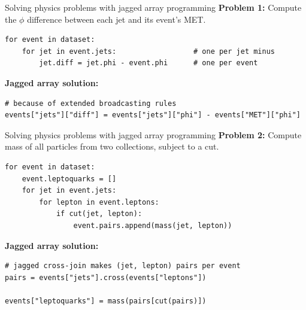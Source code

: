 \documentclass[aspectratio=169]{beamer}
\begin{document}
\begin{frame}[fragile]{Solving physics problems with jagged array programming}
\vspace{0.5 cm}
{\bf Problem 1:} Compute the $\phi$ difference between each jet and its event's MET.
\small
\begin{verbatim}
for event in dataset:
    for jet in event.jets:                  # one per jet minus
        jet.diff = jet.phi - event.phi      # one per event
\end{verbatim}
\normalsize

\vspace{0.5 cm}
{\bf Jagged array solution:} 
\small
\begin{verbatim}
# because of extended broadcasting rules
events["jets"]["diff"] = events["jets"]["phi"] - events["MET"]["phi"]
\end{verbatim}
\end{frame}

\begin{frame}[fragile]{Solving physics problems with jagged array programming}
\vspace{0.5 cm}
{\bf Problem 2:} Compute mass of all particles from two collections, subject to a cut.
\small
\begin{verbatim}
for event in dataset:
    event.leptoquarks = []
    for jet in event.jets:
        for lepton in event.leptons:
            if cut(jet, lepton):
                event.pairs.append(mass(jet, lepton))
\end{verbatim}
\normalsize

\vspace{0.5 cm}
{\bf Jagged array solution:} 
\small
\begin{verbatim}
# jagged cross-join makes (jet, lepton) pairs per event
pairs = events["jets"].cross(events["leptons"])

events["leptoquarks"] = mass(pairs[cut(pairs)])
\end{verbatim}
\end{frame}
\end{document}
